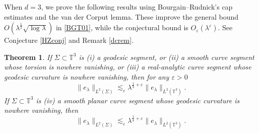 \documentclass[11pt,reqno]{amsart}
\newtheorem{theorem}{Theorem}[section]
\numberwithin{equation}{section}
\newcommand{\1}{\textbf{1}}
\newcommand{\ls}{\lesssim}
\newcommand{\eps}{\varepsilon}
\newcommand{\la}{\lambda}
\begin{document}
	When $d=3$, we prove the following results using Bourgain--Rudnick's cap estimates and the van der Corput lemma. These improve the general bound $O(\la^\frac12\sqrt{\log\la})$ in \eqref{BGT01}, while the conjectural bound is $O_\eps(\la^\eps)$. See Conjecture \ref{HZconj} and Remark \ref{dcrem}.
	\begin{theorem}\label{T3thm}
		If $\Sigma\subset \mathbb{T}^3$ is (i) a geodesic segment, or (ii) a smooth
		curve segment whose torsion is nowhere vanishing, or (iii) a real-analytic
		curve segment whose geodesic curvature is nowhere vanishing, then for any $\eps>0$
		\begin{equation}\label{T3}
			\|e_\la\|_{L^2(\Sigma)}\ls_\eps \la^{\frac13+\eps}\|e_\la\|_{L^2(\mathbb{T}^3)}.
		\end{equation}
		If $\Sigma\subset \mathbb{T}^3$ is (iv) a smooth planar curve segment whose
		geodesic curvature is nowhere vanishing, then 
		\begin{equation}
			\|e_\la\|_{L^2(\Sigma)}\ls_\eps \la^{\frac14+\eps} \|e_\la\|_{L^2(\mathbb{T}^3)}.
		\end{equation}
	\end{theorem}
\end{document}
